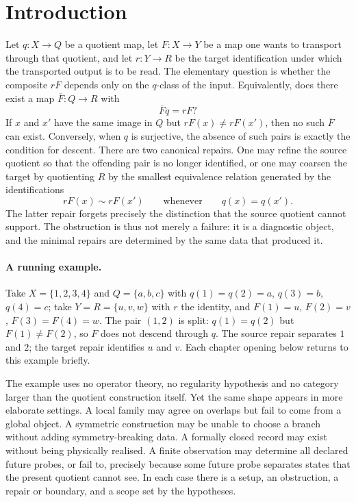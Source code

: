 \section{Introduction}\label{sec:intro}

Let \(q:X\to Q\) be a quotient map, let \(F:X\to Y\) be a map one
wants to transport through that quotient, and let \(r:Y\to R\) be the
target identification under which the transported output is to be
read.  The elementary question is whether the composite \(rF\)
depends only on the \(q\)-class of the input.  Equivalently, does
there exist a map \(\overline F:Q\to R\) with
\[
  \overline F q = rF?
\]
If \(x\) and \(x'\) have the same image in \(Q\) but \(rF(x)\ne
rF(x')\), then no such \(\overline F\) can exist.  Conversely, when
\(q\) is surjective, the absence of such pairs is exactly the
condition for descent.  There are two canonical repairs.
One may refine the source quotient so that the offending pair is no
longer identified, or one may coarsen the target by quotienting \(R\)
by the smallest equivalence relation generated by the identifications
\[
  rF(x)\sim rF(x')
  \qquad\text{whenever}\qquad
  q(x)=q(x').
\]
The latter repair forgets precisely the distinction that the source
quotient cannot support.  The obstruction is thus not merely a
failure: it is a diagnostic object, and the minimal repairs are
determined by the same data that produced it.

\paragraph{A running example.} Take \(X=\{1,2,3,4\}\) and
\(Q=\{a,b,c\}\) with \(q(1)=q(2)=a\), \(q(3)=b\), \(q(4)=c\); take
\(Y=R=\{u,v,w\}\) with \(r\) the identity, and \(F(1)=u\),
\(F(2)=v\), \(F(3)=F(4)=w\).  The pair \((1,2)\) is split:
\(q(1)=q(2)\) but \(F(1)\ne F(2)\), so \(F\) does not descend through
\(q\).  The source repair separates \(1\) and \(2\); the target repair
identifies \(u\) and \(v\).  Each chapter opening below returns to this
example briefly.

The example uses no operator theory, no regularity hypothesis and no
category larger than the quotient construction itself.  Yet the same
shape appears in more elaborate settings.  A local family may agree on
overlaps but fail to come from a global object.  A symmetric
construction may be unable to choose a branch without adding
symmetry-breaking data.  A formally closed record may exist without
being physically realised.  A finite observation may determine all
declared future probes, or fail to, precisely because some future probe
separates states that the present quotient cannot see.  In each case
there is a setup, an obstruction, a repair or boundary, and a scope set
by the hypotheses.

